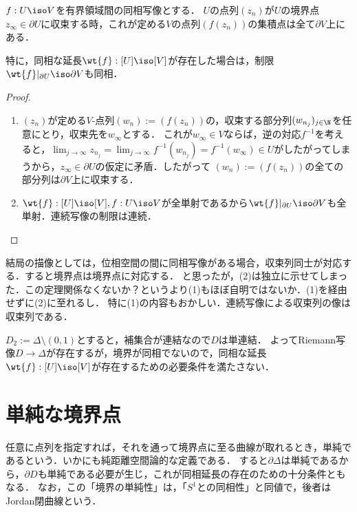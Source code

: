 \documentclass[uplatex, dvipdfmx]{jsreport}
\begin{document}
\begin{theorem}
    $f:U\iso V$を有界領域間の同相写像とする．
    $U$の点列$(z_n)$が$U$の境界点$z_\infty\in\partial U$に収束する時，これが定める$V$の点列$(f(z_n))$の集積点は全て$\partial V$上にある．

    特に，同相な延長$\wt{f}:[U]\iso [V]$が存在した場合は，制限$\wt{f}|_{\partial U}\iso\partial V$も同相．
\end{theorem}
\begin{proof}\mbox{}
    \begin{enumerate}
        \item $(z_n)$が定める$V$-点列$(w_n):=(f(z_n))$の，収束する部分列$(w_{n_j})_{j\in\N}$を任意にとり，収束先を$w_\infty$とする．
        これが$w_\infty\in V$ならば，逆の対応$f^{-1}$を考えると，$\lim_{j\to\infty}z_{n_j}=\lim_{j\to\infty}f^{-1}(w_{n_j})=f^{-1}(w_\infty)\in U$がしたがってしまうから，$z_\infty\in\partial U$の仮定に矛盾．したがって
        $(w_n):=(f(z_n))$の全ての部分列は$\partial V$上に収束する．
        \item $\wt{f}:[U]\iso [V],f:U\iso V$が全単射であるから$\wt{f}|_{\partial U}\iso\partial V$も全単射．連続写像の制限は連続．
    \end{enumerate}
\end{proof}
\begin{remarks}
    結局の描像としては，位相空間の間に同相写像がある場合，収束列同士が対応する．すると境界点は境界点に対応する．
    と思ったが，(2)は独立に示せてしまった．この定理関係なくないか？というより(1)もほぼ自明ではないか．(1)を経由せずに(2)に至れるし．
    特に(1)の内容もおかしい．連続写像による収束列の像は収束列である．
\end{remarks}

\begin{example}
    $D_2:=\Delta\setminus(0,1)$とすると，補集合が連結なので$D$は単連結．
    よってRiemann写像$D\to\Delta$が存在するが，境界が同相でないので，同相な延長$\wt{f}:[U]\iso [V]$が存在するための必要条件を満たさない．
\end{example}

\section{単純な境界点}

\begin{tcolorbox}[colframe=ForestGreen, colback=ForestGreen!10!white,breakable,colbacktitle=ForestGreen!40!white,coltitle=black,fonttitle=\bfseries\sffamily,
title=同相拡張が存在するための十分条件を位相の言葉の中に探す]
    任意に点列を指定すれば，それを通って境界点に至る曲線が取れるとき，単純であるという．いかにも純距離空間論的な定義である．
    すると$\partial\Delta$は単純であるから，$\partial D$も単純である必要が生じ，これが同相延長の存在のための十分条件ともなる．
    なお，この「境界の単純性」は，「$S^1$との同相性」と同値で，後者はJordan閉曲線という．
\end{tcolorbox}
\end{document}
